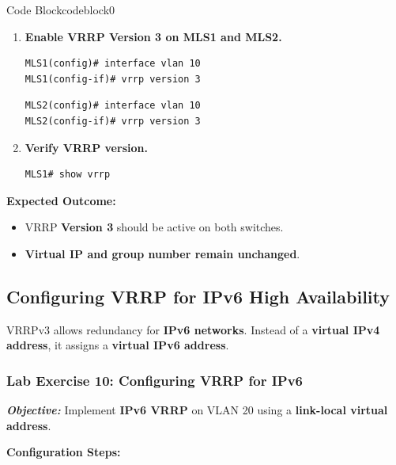 \documentclass[a4paper]{book}
\begin{document}
\begin{ocg}{Code Block}{codeblock}{0}

\vspace{0.5cm}
\begin{enumerate}
\item \textbf{Enable VRRP Version 3 on MLS1 and MLS2.}
\begin{lstlisting}
MLS1(config)# interface vlan 10
MLS1(config-if)# vrrp version 3
\end{lstlisting}
\begin{lstlisting}
MLS2(config)# interface vlan 10
MLS2(config-if)# vrrp version 3
\end{lstlisting}

\item \textbf{Verify VRRP version.}
\begin{lstlisting}
MLS1# show vrrp
\end{lstlisting}
\end{enumerate}
\end{ocg}




\textbf{Expected Outcome:}
\begin{itemize}
\item VRRP \textbf{Version 3} should be active on both switches.
\item \textbf{Virtual IP and group number remain unchanged}.
\end{itemize}

\subsection{Configuring VRRP for IPv6 High Availability}
VRRPv3 allows redundancy for \textbf{IPv6 networks}. Instead of a \textbf{virtual IPv4 address}, 
it assigns a \textbf{virtual IPv6 address}.

\subsubsection{Lab Exercise 10: Configuring VRRP for IPv6}
\textbf{\textit{Objective:}} Implement \textbf{IPv6 VRRP} on VLAN 20 using a 
\textbf{link-local virtual address}.
\vspace{0.5cm}

\textbf{Configuration Steps:}

\vspace{1.5em}

\end{document}
